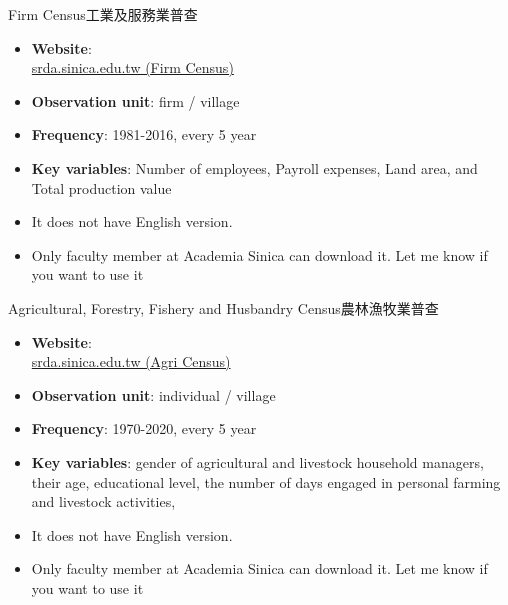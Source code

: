 \documentclass[hyperref={pdfpagelabels=false}]{beamer}
\begin{document}
\begin{frame}{Firm Census}{工業及服務業普查}
	\begin{itemize} 
		\item \textbf{Website}: \\ \href{https://srda.sinica.edu.tw/plan/?idx=SRDA.GS024}{srda.sinica.edu.tw (Firm Census)}
		\vspace{0.2cm}
		
		\item \textbf{Observation unit}: firm / village
		\vspace{0.2cm}
		\item \textbf{Frequency}: 1981-2016, every 5 year
		\vspace{0.2cm}
		\item \textbf{Key variables}: Number of employees, Payroll expenses,  Land area, and  Total production value
		\vspace{0.2cm}
		\item It does not have English version. 
		\vspace{0.2cm}
		\item Only faculty member at Academia Sinica can download it. Let me know if you want to use it
		
		
	\end{itemize}
\end{frame}



\begin{frame}{Agricultural, Forestry, Fishery and Husbandry Census}{農林漁牧業普查}
	\begin{itemize} 
		\item \textbf{Website}: \\ \href{https://srda.sinica.edu.tw/plan/?idx=SRDA.GS022}{srda.sinica.edu.tw (Agri Census)}
		\vspace{0.2cm}
		
		\item \textbf{Observation unit}: individual / village
		\vspace{0.2cm}
		\item \textbf{Frequency}: 1970-2020, every 5 year
		\vspace{0.2cm}
		\item \textbf{Key variables}: gender of agricultural and livestock household managers, their age, educational level, the number of days engaged in personal farming and livestock activities, 
		\vspace{0.2cm}
		\item It does not have English version. 
		\vspace{0.2cm}
		\item Only faculty member at Academia Sinica can download it. Let me know if you want to use it
		
		
	\end{itemize}
\end{frame}
\end{document}
